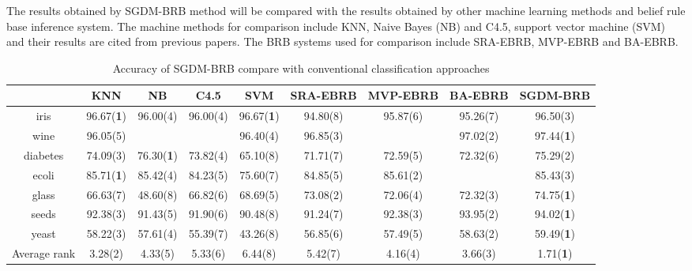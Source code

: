 \documentclass{ieeeaccess}
\begin{document}
The results obtained by SGDM-BRB method will be compared with the results obtained by
other machine learning methods and belief rule base inference system.
The machine methods for comparison include KNN, Naive Bayes (NB) and C4.5, support vector machine (SVM)
and their results are cited from previous papers\cite{a22,a27}.
The BRB systems used for comparison include SRA-EBRB\cite{a20}, MVP-EBRB\cite{a21} and BA-EBRB\cite{a22}.

\begin{table}
    \caption{Accuracy of SGDM-BRB compare with conventional classification approaches}
    \centering
    \normalsize
    \label{tab5}
    \begin{tabular}{|c|c|c|c|c|c|c|c|c|}
        \hline
                     & KNN               & NB                & C4.5     & SVM               & SRA-EBRB & MVP-EBRB & BA-EBRB  & SGDM-BRB          \\
        \hline
        iris         & 96.67(\textbf{1}) & 96.00(4)          & 96.00(4) & 96.67(\textbf{1}) & 94.80(8) & 95.87(6) & 95.26(7) & 96.50(3)          \\
        wine         & 96.05(5)          &                   &          & 96.40(4)          & 96.85(3) &          & 97.02(2) & 97.44(\textbf{1}) \\
        diabetes     & 74.09(3)          & 76.30(\textbf{1}) & 73.82(4) & 65.10(8)          & 71.71(7) & 72.59(5) & 72.32(6) & 75.29(2)          \\
        ecoli        & 85.71(\textbf{1}) & 85.42(4)          & 84.23(5) & 75.60(7)          & 84.85(5) & 85.61(2) &          & 85.43(3)          \\
        glass        & 66.63(7)          & 48.60(8)          & 66.82(6) & 68.69(5)          & 73.08(2) & 72.06(4) & 72.32(3) & 74.75(\textbf{1}) \\
        seeds        & 92.38(3)          & 91.43(5)          & 91.90(6) & 90.48(8)          & 91.24(7) & 92.38(3) & 93.95(2) & 94.02(\textbf{1}) \\
        yeast        & 58.22(3)          & 57.61(4)          & 55.39(7) & 43.26(8)          & 56.85(6) & 57.49(5) & 58.63(2) & 59.49(\textbf{1}) \\
        \hline
        Average rank & 3.28(2)           & 4.33(5)           & 5.33(6)  & 6.44(8)           & 5.42(7)  & 4.16(4)  & 3.66(3)  & 1.71(\textbf{1})  \\
        \hline
    \end{tabular}
\end{table}
\end{document}
